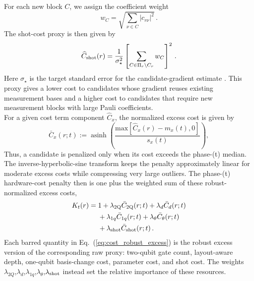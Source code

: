 \documentclass[
  reprint,
  amsmath,
  amssymb,
  aps,
  pra,
  nofootinbib,
  superscriptaddress,
  floatfix
]{revtex4-2}
\newcommand{\twq}{\mathrm{2Q}}
\begin{document}
For each new block \(C\), we assign the coefficient weight
\[
w_C = \sqrt{\sum_{\nu\in C}|c_{r\nu}|^2}\,.
\]
The shot-cost proxy is then given by
\begin{equation}
\widehat C_{\rm shot}(r)=
\frac{1}{\sigma_\star^2}
\left[
\sum_{C\in\Pi_r\setminus C_r}
w_C
\right]^2\,.
\label{eq:shot_cost_proxy}
\end{equation}
%
Here $\sigma_\star$ is the target standard error for the candidate-gradient estimate \cite{Ikhtiarudin2025ShotEfficient}. This proxy gives a lower cost to candidates whose gradient reuses existing measurement bases and a higher cost to candidates that require new measurement blocks with large Pauli coefficients.\\
For a given cost term component $\widehat C_x$, the normalized excess cost is given by
%
\begin{equation}
\bar C_x(r;t):=
\operatorname{asinh}
\left(
\frac{\text{max}[\widehat C_x(r)-m_x(t), 0]}{s_x(t)}
\right),
\label{eq:cost_robust_excess}
\end{equation}
%
Thus, a candidate is penalized only when its cost exceeds the phase-(t) median. The inverse-hyperbolic-sine transform keeps the penalty approximately linear for moderate excess costs while compressing very large outliers\cite{IglewiczHoaglin1993,Burbidge1988IHS}.
The phase-(t) hardware-cost penalty then is one plus the weighted sum of these robust-normalized excess costs,
\begin{equation}
\begin{aligned}
K_t(r)
={}&
1+\lambda_{\twq}\bar C_{\twq}(r;t)
+\lambda_d \bar C_d(r;t)\\
&+\lambda_{1q}\bar C_{1q}(r;t)
 +\lambda_\theta \bar C_\theta(r;t)\\
&+\lambda_{\rm shot}\bar C_{\rm shot}(r;t)\,.
\end{aligned}
\label{eq:hardware_cost_sum}
\end{equation}
%
Each barred quantity in Eq.~(\ref{eq:cost_robust_excess}) is the robust excess version of the corresponding raw proxy: two-qubit gate count, layout-aware depth, one-qubit basis-change cost, parameter cost, and shot cost. The weights \(\lambda_{2Q}\),\(\lambda_d\),\(\lambda_{1q}\),\(\lambda_\theta\),\(\lambda_{\rm shot}\) instead set the relative importance of these resources.
\end{document}
